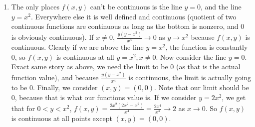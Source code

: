 \documentclass[12pt]{article}
\theoremstyle{definition}
\theoremstyle{remark}
\newcommand{\R}{\mathbb{R}}
\newcommand{\mg}[1]{\| #1 \|}
\newcommand{\linf}[1]{\max_{1\leq i \leq #1}}
\newcommand{\ve}{\varepsilon}
\renewcommand{\leq}{\leqslant}
\begin{document}
\begin{enumerate}[leftmargin=\labelsep]
\begin{proof}
			Let $1 \leq p < \infty$, and suppose now that $f:\R^n \to \R^m$ is $p$-continuous, and let $\ve > 0$. Choose $\delta$ so that $\forall y \in \R^n$ with $0 < \mg{x-y}_p < \delta \implies \mg{f(x)-f(y)}_p < \ve$. Now choose $\delta' = \delta/\sqrt[p]{n}$. Note that $\forall y \in \R^n$ with $0 < \linf{n}|x_i-y_i| < \delta'$, we have that ${\color{red}0 <} \mg{x-y}_p \leq \sqrt[p]{n}\linf{n}|x_i-y_i|< \sqrt[p]{n}\delta'=\sqrt[p]{n}\delta/\sqrt[p]{n}=\delta$ and so $\linf{n} |f(x)_i-f(y)_i| \leq \mg{x-y}_p < \ve$. Note for both of these cases if the vector has nonzero length then it has a nonzero element, so having a nonzero element $\iff$ having nonzero length, which is why the inequalities in red are justified.
		\end{proof}
		Let $1\leq p < \infty$. By the above, we have that $2$-continuous $\iff$ $\infty$-continuous $\iff$ $p$-continuous, so $p$-continuous iff $2$-continuous. Now let $1 \leq p,q < \infty$. By the above again, we see that $p$-continuous $\iff$ $\infty$-continuous $\iff$ $q$-continuous, so $p$-continuous iff $q$-continuous.
		
		\item 
		The only places $f(x, y)$ can't be continuous is the line $y = 0$, and the line $y = x^2$. Everywhere else it is well defined and continuous (quotient of two continuous functions are continuous as long as the bottom is nonzero, and 0 is obviously continuous). If $x \neq 0$,  $\frac{y(y-x^2)}{x^4} \to 0$ as $y \to x^2$ because $f(x, y)$ is continuous. Clearly if we are above the line $y=x^2$, the function is constantly $0$, so $f(x,y)$ is continuous at all $y=x^2, x \neq 0$. Now consider the line $y=0$. Exact same story as above, we need the limit to be 0 (as that is the actual function value), and because $\frac{y(y-x^2)}{x^4}$ is continuous, the limit is actually going to be 0. Finally, we consider $(x, y)=(0, 0)$. Note that our limit should be 0, because that is what our functions value is. If we consider $y=2x^2$, we get that for $0 < y < x^2$, $f(x, y)=\frac{2x^2(2x^2-x^2)}{x^4}=\frac{2x^4}{x^4} \to 2$ as $x \to 0$. So $f(x,y)$ is continuous at all points except $(x, y) = (0, 0)$. 
	\end{enumerate}
\end{document}
